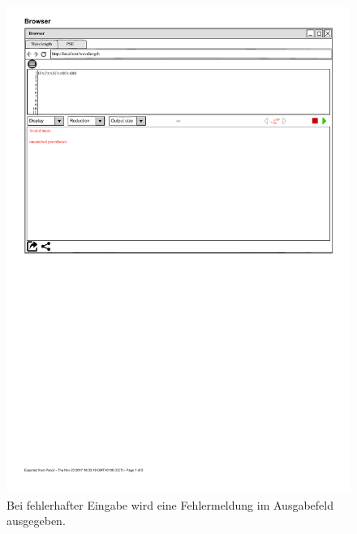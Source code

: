 \documentclass[parskip=full,11pt,twoside]{scrartcl}
\begin{document}
\begin{figure}[H]
	\centering
	\includegraphics[width=\textwidth]{img/fehlerausgabe}
	\caption{Bei fehlerhafter Eingabe wird eine Fehlermeldung im Ausgabefeld ausgegeben.
}
\end{figure}
\end{document}
